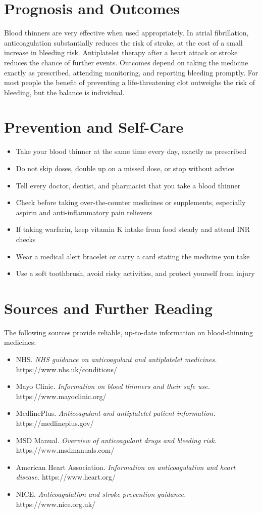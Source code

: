\section*{Prognosis and Outcomes}
Blood thinners are very effective when used appropriately. In atrial fibrillation, anticoagulation substantially reduces the risk of stroke, at the cost of a small increase in bleeding risk. Antiplatelet therapy after a heart attack or stroke reduces the chance of further events. Outcomes depend on taking the medicine exactly as prescribed, attending monitoring, and reporting bleeding promptly. For most people the benefit of preventing a life-threatening clot outweighs the risk of bleeding, but the balance is individual.

\section*{Prevention and Self-Care}
\begin{itemize}
    \item Take your blood thinner at the same time every day, exactly as prescribed
    \item Do not skip doses, double up on a missed dose, or stop without advice
    \item Tell every doctor, dentist, and pharmacist that you take a blood thinner
    \item Check before taking over-the-counter medicines or supplements, especially aspirin and anti-inflammatory pain relievers
    \item If taking warfarin, keep vitamin K intake from food steady and attend INR checks
    \item Wear a medical alert bracelet or carry a card stating the medicine you take
    \item Use a soft toothbrush, avoid risky activities, and protect yourself from injury
\end{itemize}

\section*{Sources and Further Reading}
The following sources provide reliable, up-to-date information on blood-thinning medicines:

\begin{itemize}
    \item NHS. \textit{NHS guidance on anticoagulant and antiplatelet medicines.} https://www.nhs.uk/conditions/
    \item Mayo Clinic. \textit{Information on blood thinners and their safe use.} https://www.mayoclinic.org/
    \item MedlinePlus. \textit{Anticoagulant and antiplatelet patient information.} https://medlineplus.gov/
    \item MSD Manual. \textit{Overview of anticoagulant drugs and bleeding risk.} https://www.msdmanuals.com/
    \item American Heart Association. \textit{Information on anticoagulation and heart disease.} https://www.heart.org/
    \item NICE. \textit{Anticoagulation and stroke prevention guidance.} https://www.nice.org.uk/
\end{itemize}
